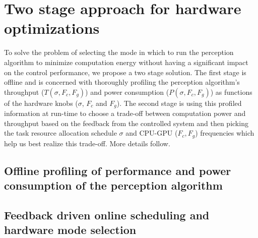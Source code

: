 \section{Two stage approach for hardware optimizations}

To solve the problem of selecting the mode in which to run the perception algorithm to minimize computation energy without having a significant impact on the control performance, we propose a two stage solution. The first stage is offline and is concerned with thoroughly profiling the perception algorithm's throughput ($T(\sigma,F_c,F_g)$) and power consumption ($P(\sigma,F_c,F_g)$) as functions of the hardware knobs ($\sigma$, $F_c$ and $F_g$). The second stage is using this profiled information at run-time to choose a trade-off between computation power and throughput based on the feedback from the controlled system and then picking the task resource allocation schedule $\sigma$ and CPU-GPU ($F_c,F_g$) frequencies which help us best realize this trade-off. More details follow.

\subsection{Offline profiling of performance and power consumption of the perception algorithm}
\label{sec:profiling}


\subsection{Feedback driven online scheduling and hardware mode selection}
\label{sec:scheduling}

